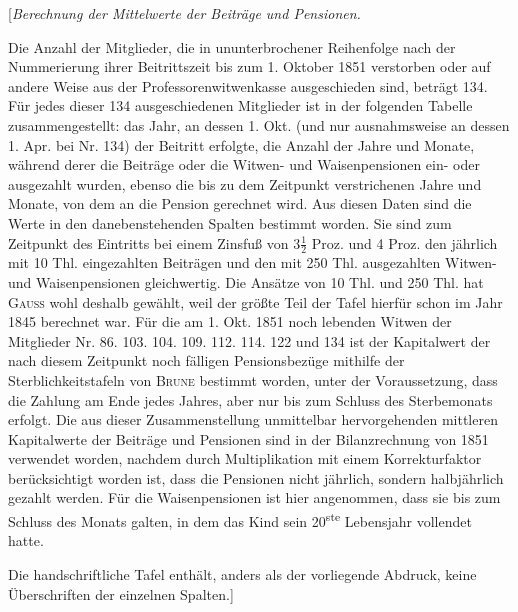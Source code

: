\Needspace{75pt}
\begin{center}[\textit{Berechnung der Mittelwerte der Beiträge und Pensionen.}\end{center}
\noindent\hspace*{\parindent}Die Anzahl der Mitglieder, die in ununterbrochener Reihenfolge nach der Nummerierung ihrer Beitrittszeit bis zum 1. Oktober 1851 verstorben oder auf andere Weise aus der Professorenwitwenkasse ausgeschieden sind, beträgt 134. Für jedes dieser 134 ausgeschiedenen Mitglieder ist in der folgenden Tabelle zusammengestellt: das Jahr, an dessen 1. Okt. (und nur ausnahmsweise an dessen 1. Apr. bei Nr. 134) der Beitritt erfolgte, die Anzahl der Jahre und Monate, während derer die Beiträge oder die Witwen- und Waisenpensionen ein- oder ausgezahlt wurden, ebenso die bis zu dem Zeitpunkt verstrichenen Jahre und Monate, von dem an die Pension gerechnet wird. Aus diesen Daten sind die Werte in den danebenstehenden Spalten bestimmt worden. Sie sind zum Zeitpunkt des Eintritts bei einem Zinsfuß von \(3\tfrac{1}{2}\) Proz. und 4 Proz. den jährlich mit 10 Thl. eingezahlten Beiträgen und den mit 250 Thl. ausgezahlten Witwen- und Waisenpensionen gleichwertig. Die Ansätze von 10 Thl. und 250 Thl. hat \textsc{Gauss} wohl deshalb gewählt, weil der größte Teil der Tafel hierfür schon im Jahr 1845 berechnet war. Für die am 1. Okt. 1851 noch lebenden Witwen der Mitglieder Nr. 86. 103. 104. 109. 112. 114. 122 und 134 ist der Kapitalwert der nach diesem Zeitpunkt noch fälligen Pensionsbezüge mithilfe der Sterblichkeitstafeln von \textsc{Brune} bestimmt worden, unter der Voraussetzung, dass die Zahlung am Ende jedes Jahres, aber nur bis zum Schluss des Sterbemonats erfolgt. Die aus dieser Zusammenstellung unmittelbar hervorgehenden mittleren Kapitalwerte der Beiträge und Pensionen sind in der Bilanzrechnung von 1851 verwendet worden, nachdem durch Multiplikation mit einem Korrekturfaktor berücksichtigt worden ist, dass die Pensionen nicht jährlich, sondern halbjährlich gezahlt werden. Für die Waisenpensionen ist hier angenommen, dass sie bis zum Schluss des Monats galten, in dem das Kind sein 20\textsuperscript{ste} Lebensjahr vollendet hatte.

Die handschriftliche Tafel enthält, anders als der vorliegende Abdruck, keine Überschriften der einzelnen Spalten.]
